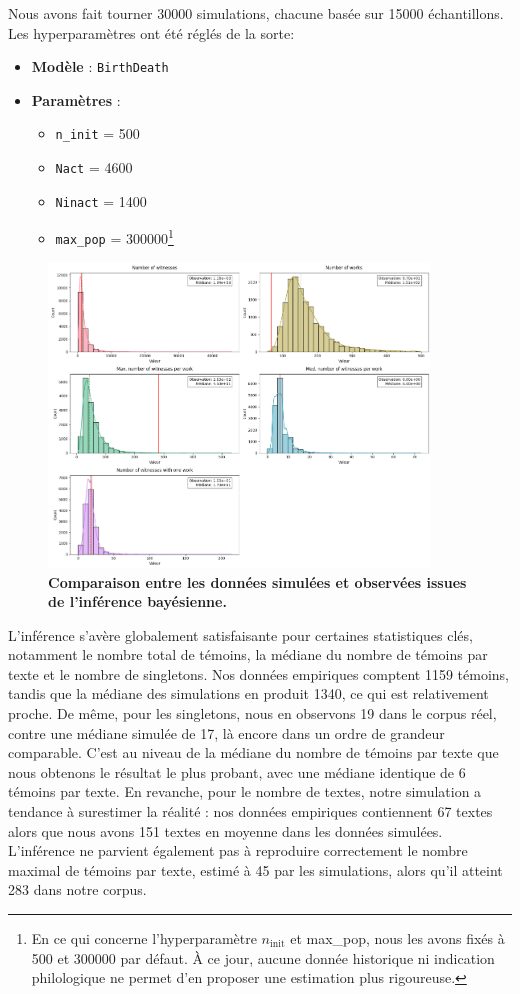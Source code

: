 \documentclass[a4paper,twoside,12pt]{book}
\begin{document}
Nous avons fait tourner 30000 simulations, chacune basée sur 15000 échantillons. Les hyperparamètres ont été réglés de la sorte: \begin{itemize}
	\item \textbf{Modèle} : \texttt{BirthDeath}
	\item \textbf{Paramètres} :
	\begin{itemize}
		\item \texttt{n\_init} = 500
		\item \texttt{Nact} = 4600
		\item \texttt{Ninact} = 1400
		\item \texttt{max\_pop} = 300000\footnote{En ce qui concerne l’hyperparamètre \( n_{\text{init}} \) et max\_pop, nous les avons fixés à 500 et 300000 par défaut. À ce jour, aucune donnée historique ni indication philologique ne permet d’en proposer une estimation plus rigoureuse.
		}
	\end{itemize}
\end{itemize}


\begin{figure}[H]
	\centering
	\includegraphics[width=0.9\textwidth]{img/simus_plot.png}
	\caption{\textbf{Comparaison entre les données simulées et observées issues de l’inférence bayésienne.}}
	\label{fig:fig_simus}
\end{figure}

L’inférence s’avère globalement satisfaisante pour certaines statistiques clés, notamment le nombre total de témoins, la médiane du nombre de témoins par texte et le nombre de singletons. Nos données empiriques comptent 1159 témoins, tandis que la médiane des simulations en produit 1340, ce qui est relativement proche. De même, pour les singletons, nous en observons 19 dans le corpus réel, contre une médiane simulée de 17, là encore dans un ordre de grandeur comparable. C'est au niveau de la médiane du nombre de témoins par texte que nous obtenons le résultat le plus probant, avec une médiane identique de 6 témoins par texte. En revanche, pour le nombre de textes, notre simulation a tendance à surestimer la réalité : nos données empiriques contiennent 67 textes alors que nous avons 151 textes en moyenne dans les données simulées. L’inférence ne parvient également pas à reproduire correctement le nombre maximal de témoins par texte, estimé à 45 par les simulations, alors qu’il atteint 283 dans notre corpus.
\end{document}

